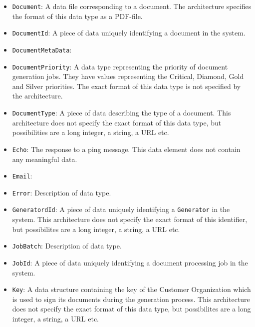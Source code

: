 \documentclass[a4paper,10pt]{article}
\begin{document}
\begin{itemize}
	\item \texttt{Document}: A data file corresponding to a document.  The architecture specifies the format of this data type as a PDF-file. 
	
	\item \texttt{DocumentId}: A piece of data uniquely identifying a document in the system.

	\item \texttt{DocumentMetaData}: 
	
	\item \texttt{DocumentPriority}: A data type representing the priority of document generation jobs. They have values representing the Critical, Diamond, Gold and Silver priorities. The exact format of this data type is not specified by the architecture.
	
	\item \texttt{DocumentType}: A piece of data describing the type of a document. This architecture does not specify the exact format of this data type, but possibilities are a long integer, a string, a URL etc.
	
	\item \texttt{Echo}: The response to a ping message. This data element does not contain any meaningful data.
	
	\item \texttt{Email}:
	
	\item \texttt{Error}: Description of data type.
	
    \item \texttt{GeneratordId}: A piece of data uniquely identifying a \texttt{Generator} in the system. This architecture does not specify the exact format of this identifier, but possibilites are a long integer, a string, a URL etc.
    
    \item \texttt{JobBatch}: Description of data type.
    
    \item \texttt{JobId}: A piece of data uniquely identifying a document processing job in the system.
    
    \item \texttt{Key}: A data structure containing the key of the Customer Organization which is used to sign its documents during the generation process. This architecture does not specify the exact format of this data type, but possibilites are a long integer, a string, a URL etc.
    

\end{itemize}
\end{document}

